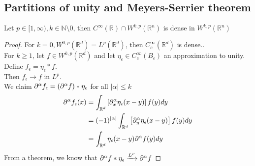 \documentclass[../main.tex]{subfiles}
\begin{document}
\subsection{Partitions of unity and Meyers-Serrier theorem}
\begin{thm}
	Let $p \in [ 1, \infty ) , k \in \mathbb{N}\setminus 0$, then $ C^{ \infty }( \mathbb{R}) \cap W^{k,p}( \mathbb{R}^{n}) $ is dense in $W^{k,p}( \mathbb{R}^{n}) $ 
\end{thm}
\begin{proof}
For $k=0, W^{0,p}( \mathbb{R}^{d}) =L^{p}( \mathbb{R}^{d})$, then $C^{ \infty }_c ( \mathbb{R}^{d}) $ is dense..\\
For $k \geq 1$, let $f \in W^{k,p}(  \mathbb{R}^{d}) $ and let $\eta_\epsilon\in C^{ \infty }_c( B_{\epsilon} ) $ an approximation to unity.\\
Define $f_\epsilon = \eta_\epsilon \ast f$.\\
Then $f_\epsilon \to f$ in $L^{p}$.\\
We claim $\partial^{\alpha}f_\epsilon = ( \partial^{\alpha} f ) \ast \eta_\epsilon$ for all $|\alpha| \leq k$ 
\begin{align*}
\partial^{\alpha}f_\epsilon( x)  &= \int_{ \mathbb{R}^{d} }^{  } \left[ \partial_x^{\alpha}\eta_\epsilon ( x-y) \right] f( y) dy\\
&= ( -1)^{|\alpha|} \int_{ \mathbb{R}^{d} }^{  } \left[ \partial_y^{\alpha}\eta_\epsilon ( x-y) \right] f( y) dy\\
&= \int_{  \mathbb{R}^{d}}^{  } \eta_\epsilon ( x-y) \partial^{\alpha}f( y) dy
\end{align*}
From a theorem, we know that $\partial^{\alpha}f \ast \eta_\epsilon \xrightarrow{L^{p}} \partial^{\alpha}f$ 
\end{proof}
\end{document}
